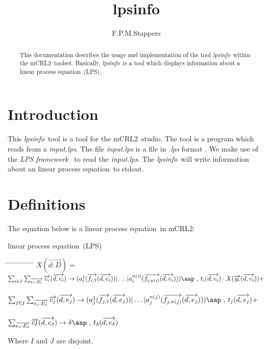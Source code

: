 \documentclass[a4paper,10pt]{article}
\title{lpsinfo}
\author{F.P.M.Stappers}
\theoremstyle{plain}
\theoremstyle{definition}
\newcommand{\mcrl}{mCRL2}
\newcommand{\lps}{linear process equation}
\newcommand{\tool}{\textit{lpsinfo}}
\newcommand{\ti}{\textit}
\newcommand{\ovr}{\overrightarrow}
\newcommand{\framework}{\textit{LPS framework} \cite{LPSframework}}
\newcommand{\tab}{\hspace*{5.mm} \= \hspace*{5.mm} \= \hspace*{5.mm} \= \hspace*{5.mm} \= \hspace*{5.mm} \= \hspace*{5.mm}  \= \hspace*{5.mm}  \= \hspace*{5.mm}  \= \hspace*{5.mm} \= \hspace*{5.mm} \= \hspace*{5.mm}  \= \hspace*{5.mm}  \= \hspace*{5.mm}\kill}
\newcommand{\at}[1]{\mbox{\aap ,} #1}
\begin{document}
\maketitle

\begin{abstract}
This documentation describes the usage and implementation of the tool \tool\ within the \mcrl\ toolset.
Basically, \tool\ is a tool which displays information about a \lps\ (LPS).
\end{abstract}

\section{Introduction}
This \tool\ tool is a tool for the \mcrl\ studio. The tool is a program which reads from a \ti{input.lps}. The file \ti{input.lps} is
a file in \ti{.lps} format \cite{LPSformat}. We make use of the
\framework\ to read the \ti{input.lps}. The \tool\ will write
information about an \lps\ to stdout. 
\section{Definitions} \label{sec:def}

The equation below is a \lps\ in \mcrl : 
\begin{defn}\lps\ (LPS) \newline
\begin{tabbing}
\tab
$X (\ovr{d: D}) = $ \> \> \> $ \sum_{i \in I} \sum_{\ovr{e_i: E_i}} \ovr{c_i} ( \ovr{d, e_i }) \rightarrow 
(a_i^1 (\ovr{f_{i,1}}(\ovr{d,e_i})) \vert \ldots \vert a_i^{n(i)}(\ovr{f_{i,n(i)}}(\ovr{d,e_i}))) \at \text{ } t_i(\ovr{d,e_i})  \cdot X(\ovr{g_i}(\ovr{d,e_i})) +$ \\ \\
\> \> \> $ \sum_{j \in j} \sum_{\ovr{e_j: E_j}} \ovr{c_j} ( \ovr{d, e_j} ) \rightarrow 
(a_j^1 (\ovr{f_{j,1}}(\ovr{d,e_j})) \vert \ldots \vert a_j^{n(j)}(\ovr{f_{j,n(j)}}(\ovr{d,e_j}))) \at \text{ } t_j(\ovr{d,e_j}) + $ \\ \\
\> \> \> $\sum_{\ovr{e_\delta:E_\delta}} \ovr{c_\delta} ( \ovr{d, e_\delta}) \rightarrow 
\delta \at \text{ } t_\delta(\ovr{d,e_\delta})$ 
\end{tabbing}

Where $I$ and $J$ are disjoint.\\
\end{defn}
\end{document}
